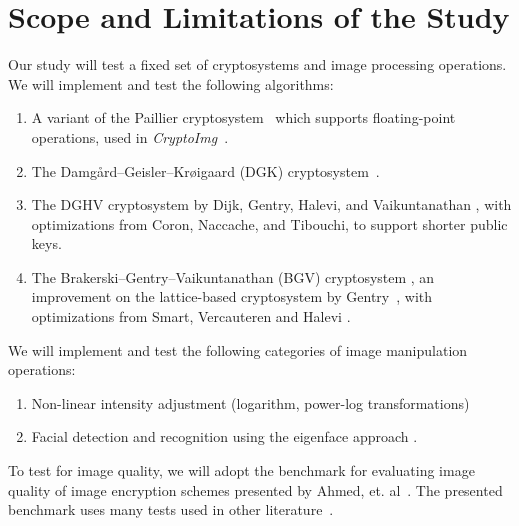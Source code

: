 \section{Scope and Limitations of the Study}
Our study will test a fixed set of cryptosystems and image processing operations. 
We will implement and test the following algorithms:
\begin{enumerate}
	\item A variant of the Paillier cryptosystem~\cite{stern_public-key_1999} which supports floating-point operations, used in \textit{CryptoImg}~\cite{ziad_cryptoimg:_2016}.
  \item The Damg{\aa}rd--Geisler--Kr{\o}igaard (DGK) cryptosystem~\cite{pieprzyk_efficient_2007, cryptoeprint:2008:321}.
	\item The DGHV cryptosystem by Dijk, Gentry, Halevi, and Vaikuntanathan \cite{cryptoeprint:2009:616}, with optimizations from Coron, Naccache, and Tibouchi, \cite{cryptoeprint:2011:277, cryptoeprint:2011:440} to support shorter public keys.
	\item The Brakerski--Gentry--Vaikuntanathan (BGV) cryptosystem \cite{cryptoeprint:2011:277}, an improvement on the lattice-based cryptosystem by Gentry~\cite{gentry_fully_2009}, with optimizations from Smart, Vercauteren and Halevi \cite{hutchison_fully_2010, cryptoeprint:2011:566}.
\end{enumerate}
We will implement and test the following categories of image manipulation operations:
\begin{enumerate}
	\item Non-linear intensity adjustment (logarithm, power-log transformations)
	\item Facial detection and recognition using the eigenface approach \cite{turk_eigenfaces_1991}.
\end{enumerate}
To test for image quality, we will adopt the benchmark for evaluating image quality of image encryption schemes presented by Ahmed, et. al~\cite{ahmed_benchmark_2016}. The presented benchmark uses many tests used in other literature~\cite{ahmad_efficiency_2012, wu_npcr_2011}.
